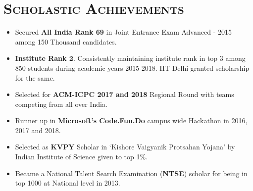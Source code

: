 \documentclass{article}
\newcommand{\tmpsection}[1]{}
\let\tmpsection=\section
\renewcommand{\section}[1]{\tmpsection*{\textsc{#1}}}
\begin{document}
\section{Scholastic Achievements}
\begin{itemize}
    \setlength\itemsep{0.0em}
    \item Secured \textbf{All India Rank 69} in Joint Entrance Exam Advanced - 2015 among 150 Thousand candidates.
    \item \textbf{Institute Rank 2}. Consistently maintaining institute rank in top 3 among 850 students during academic years 2015-2018. IIT Delhi granted scholarship for the same.
    \item Selected for \textbf{ACM-ICPC 2017 and 2018} Regional Round with teams competing from all over India.
    \item Runner up in \textbf{Microsoft's Code.Fun.Do} campus wide Hackathon in 2016, 2017 and 2018.
    \item Selected as \textbf{KVPY} Scholar in `Kishore Vaigyanik Protsahan Yojana' by Indian Institute of Science given to top 1\%.
    \item Became a National Talent Search Examination (\textbf{NTSE}) scholar for being in top 1000 at National level in 2013.
\end{itemize}
\end{document}
